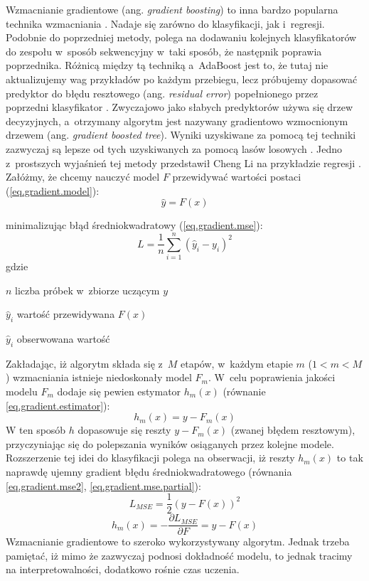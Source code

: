 Wzmacnianie gradientowe (ang. \textit{gradient boosting}) to inna bardzo popularna technika wzmacniania \cite{Sawka18}. Nadaje się zarówno do klasyfikacji, jak i~regresji. Podobnie do poprzedniej metody, polega na dodawaniu kolejnych klasyfikatorów do zespołu w~sposób sekwencyjny w~taki sposób, że następnik poprawia poprzednika. Różnicą między tą techniką a~AdaBoost jest to, że tutaj nie aktualizujemy wag przykładów po każdym przebiegu, lecz próbujemy dopasować predyktor do błędu resztowego (ang. \textit{residual error}) popełnionego przez poprzedni klasyfikator \cite{Sawka18}. Zwyczajowo jako słabych predyktorów używa się drzew decyzyjnych, a~otrzymany algorytm jest nazywany gradientowo wzmocnionym drzewem (ang. \textit{gradient boosted tree}). Wyniki uzyskiwane za pomocą tej techniki zazwyczaj są lepsze od tych uzyskiwanych za pomocą lasów losowych \cite{Piryonesi19}. Jedno z~prostszych wyjaśnień tej metody przedstawił Cheng Li na przykładzie regresji \cite{Li}. Załóżmy, że chcemy nauczyć model $F$ przewidywać wartości postaci (\ref{eq.gradient.model}):
\begin{equation}
\label{eq.gradient.model}
\hat y = F(x)
\end{equation}

\noindent minimalizując błąd średniokwadratowy (\ref{eq.gradient.mse}):
\begin{equation}
\label{eq.gradient.mse}
L=\frac 1 n \sum_{i=1}^n(\hat y_i-y_i)^2
\end{equation}
gdzie
\begin{eqwhere}[2cm]
	\item $n$ liczba próbek w~zbiorze uczącym $y$
	\item $\hat y_i$ wartość przewidywana $F(x)$
	\item $\hat y_i$ obserwowana wartość
\end{eqwhere}

\noindent Zakładając, iż algorytm składa się z~$M$ etapów, w~każdym etapie $m$ ($1<m<M$) wzmacniania istnieje niedoskonały model $F_m$. W~celu poprawienia jakości modelu $ F_m$ dodaje się pewien estymator $h_m(x)$ (równanie \ref{eq.gradient.estimator}):
\begin{equation}
\label{eq.gradient.estimator}
	h_m(x)=y-F_m(x)
\end{equation}
W ten sposób $h$ dopasowuje się reszty $y-F_m(x)$ (zwanej błędem resztowym), przyczyniając się do polepszania wyników osiąganych przez kolejne modele. Rozszerzenie tej idei do klasyfikacji polega na obserwacji, iż reszty $h_m(x)$ to tak naprawdę ujemny gradient błędu średniokwadratowego (równania \ref{eq.gradient.mse2}, \ref{eq.gradient.mse.partial}):
\begin{equation}
\label{eq.gradient.mse2}
L_{MSE}=\frac 1 2(y-F(x))^2
\end{equation}
\begin{equation}
\label{eq.gradient.mse.partial}
h_m(x)=-\frac {\partial L_{MSE}} {\partial F}=y-F(x)
\end{equation}
Wzmacnianie gradientowe to szeroko wykorzystywany algorytm. Jednak trzeba pamiętać, iż mimo że zazwyczaj podnosi dokładność modelu, to jednak tracimy na interpretowalności, dodatkowo rośnie czas uczenia.

